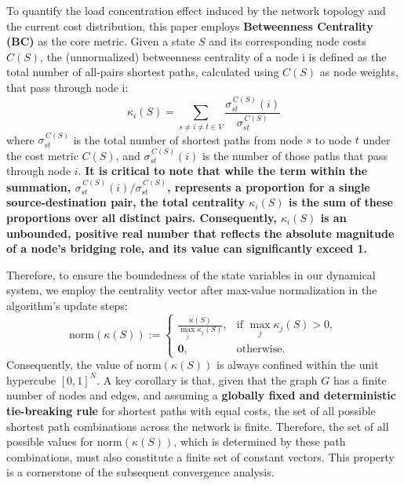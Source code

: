 \documentclass[journal]{IEEEtran}
\begin{document}
To quantify the load concentration effect induced by the network topology and the current cost distribution, this paper employs \textbf{Betweenness Centrality (BC)} as the core metric. Given a state $S$ and its corresponding node costs $C(S)$, the (unnormalized) betweenness centrality of a node i is defined as the total number of all-pairs shortest paths, calculated using $C(S)$ as node weights, that pass through node i:
\begin{equation}
    \label{eq:bc_definition}
    \kappa_i(S) = \sum_{s\neq i\neq t\in V} \frac{\sigma^{\,C(S)}_{st}(i)}{\sigma^{\,C(S)}_{st}}
\end{equation}
where $\sigma^{\,C(S)}_{st}$ is the total number of shortest paths from node $s$ to node $t$ under the cost metric $C(S)$, and $\sigma^{\,C(S)}_{st}(i)$ is the number of those paths that pass through node $i$. 
\textbf{It is critical to note that while the term within the summation, $\sigma^{\,C(S)}_{st}(i)/\sigma^{\,C(S)}_{st}$, represents a proportion for a single source-destination pair, the total centrality $\kappa_i(S)$ is the sum of these proportions over all distinct pairs. Consequently, $\kappa_i(S)$ is an unbounded, positive real number that reflects the absolute magnitude of a node's bridging role, and its value can significantly exceed 1.}

Therefore, to ensure the boundedness of the state variables in our dynamical system, we employ the centrality vector after max-value normalization in the algorithm's update steps:
\begin{equation}
    \label{eq:bc_normalization}
    \mathrm{norm}(\kappa(S)) :=
    \begin{cases}
    \displaystyle \frac{\kappa(S)}{\max_{j}\kappa_j(S)}, & \text{if } \max_j \kappa_j(S) > 0,\\[6pt]
    \mathbf{0}, & \text{otherwise.}
    \end{cases}
\end{equation}
Consequently, the value of $\mathrm{norm}(\kappa(S))$ is always confined within the unit hypercube $[0,1]^N$. A key corollary is that, given that the graph $G$ has a finite number of nodes and edges, and assuming a \textbf{globally fixed and deterministic tie-breaking rule} for shortest paths with equal costs, the set of all possible shortest path combinations across the network is finite. Therefore, the set of all possible values for $\mathrm{norm}(\kappa(S))$, which is determined by these path combinations, must also constitute a finite set of constant vectors. This property is a cornerstone of the subsequent convergence analysis.
\end{document}
